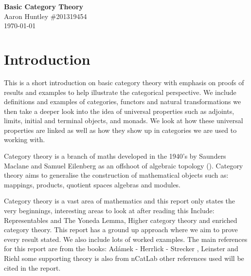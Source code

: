 \documentclass[11pt,a4paper]{article}
\theoremstyle{definition}
\numberwithin{equation}{section}
\begin{document}
\thispagestyle{plain}
\begin{center}
{\bf \huge Basic Category Theory} 
\vspace{4mm} \\
Aaron Huntley \#201319454
\vspace{4mm} \\
\today
\end{center}

\tableofcontents 

\noindent \hrulefill

\pagebreak
\section{Introduction}
\label{s:intro} 
This is a short introduction on basic category theory with emphasis on proofs of results and examples to help illustrate the categorical perspective. We include definitions and examples of categories, functors and natural transformations we then take a deeper look into the idea of universal properties such as adjoints, limits, initial and terminal objects, and monads. We look at how these universal properties are linked as well as how they show up in categories we are used to working with. 

Category theory is a branch of maths developed in the 1940's by Saunders Maclane and Samuel Eilenberg as an offshoot of algebraic topology (\cite{wiki:history}). Category theory aims to generalise the construction of mathematical objects such as: mappings, products, quotient spaces algebras and modules.

Category theory is a vast area of mathematics and this report only states the very beginnings, interesting areas to look at after reading this Include: Representables and The Yoneda Lemma, Higher category theory and enriched category theory. This report has a ground up approach where we aim to prove every result stated. We also include lots of worked examples. The main references for this report are from the books: Adámek - Herrlick - Strecker \cite{ACC}, Leinster \cite{Leinster}  and Riehl \cite{Riehl} some supporting theory is also from nCatLab \cite{nLab} other references used will be cited in the report.

\end{document}
